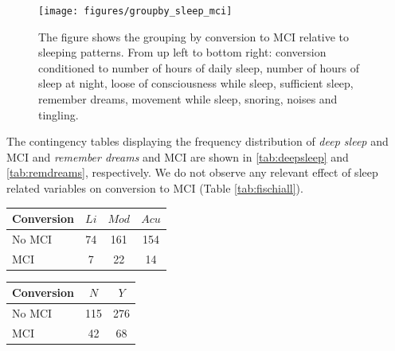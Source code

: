 \documentclass[11pt]{article}
\theoremstyle{definition}
\theoremstyle{remark}
\begin{document}
\begin{figure}[!htb]
        \centering
        \texttt{[image: figures/groupby\_sleep\_mci]}
        \caption{The figure shows the grouping by conversion to MCI relative to sleeping patterns. From up left to bottom right: conversion conditioned to number of hours of daily sleep, number of hours of sleep at night, loose of consciousness while sleep, sufficient sleep, remember dreams, movement while sleep, snoring, noises and tingling.} 
        \label{fig:groupby_sleep_mci}
\end{figure}

The contingency tables displaying the frequency distribution of \emph{deep sleep} and MCI and \emph{remember dreams} and MCI are shown in \ref{tab:deepsleep} and \ref{tab:remdreams}, respectively. 
We do not observe any relevant effect of sleep related variables on conversion to MCI (Table \ref{tab:fischiall}).


\begin{minipage}[b]{.40\textwidth}
   \centering
    \begin{tabular}[t]{lccc}
    \hline
    Conversion&{$Li$}&{$Mod$}&{$Acu$} \\
    \hline
    No MCI&74&161 & 154\\
    MCI&7 &  22  & 14\\
    \hline
  \end{tabular}
   \label{tab:deepsleep}
\end{minipage}\qquad
\begin{minipage}[b]{.40\textwidth}
   \centering
    \begin{tabular}[t]{lcc}
    \hline
    Conversion&{$N$}&{$Y$} \\
    \hline
    No MCI&115&276\\
    MCI&42&68\\
    \hline
  \end{tabular}
   \label{tab:remdreams}
\end{minipage}
\end{document}
